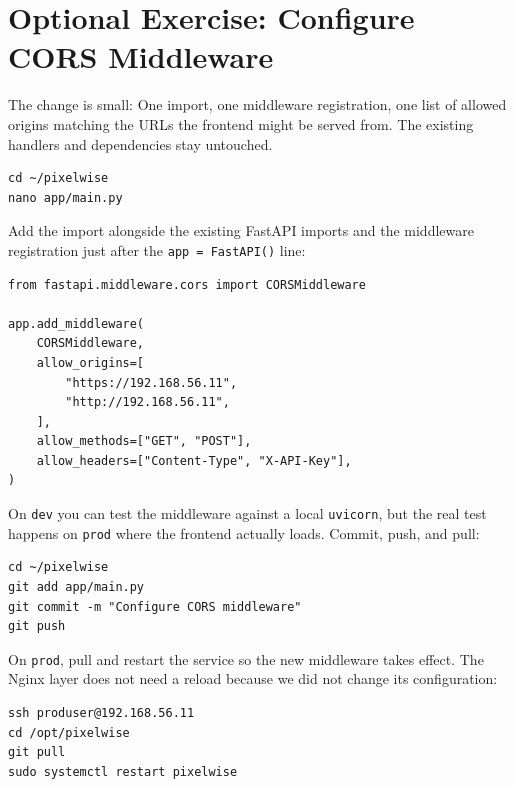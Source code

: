 \section{Optional Exercise: Configure CORS Middleware}

The change is small: One import, one middleware registration, one
list of allowed origins matching the URLs the frontend might be served
from.
The existing handlers and dependencies stay untouched.

\begin{verbatim}
cd ~/pixelwise
nano app/main.py
\end{verbatim}

Add the import alongside the existing FastAPI imports and the
middleware registration just after the \texttt{app = FastAPI()} line:

\begin{verbatim}
from fastapi.middleware.cors import CORSMiddleware

app.add_middleware(
    CORSMiddleware,
    allow_origins=[
        "https://192.168.56.11",
        "http://192.168.56.11",
    ],
    allow_methods=["GET", "POST"],
    allow_headers=["Content-Type", "X-API-Key"],
)
\end{verbatim}


On \texttt{dev} you can test the middleware against a local
\texttt{uvicorn}, but the real test happens on \texttt{prod} where the
frontend actually loads.
Commit, push, and pull:

\begin{verbatim}
cd ~/pixelwise
git add app/main.py
git commit -m "Configure CORS middleware"
git push
\end{verbatim}

On \texttt{prod}, pull and restart the service so the new middleware
takes effect.
The Nginx layer does not need a reload because we did not change its
configuration:

\begin{verbatim}
ssh produser@192.168.56.11
cd /opt/pixelwise
git pull
sudo systemctl restart pixelwise
\end{verbatim}

